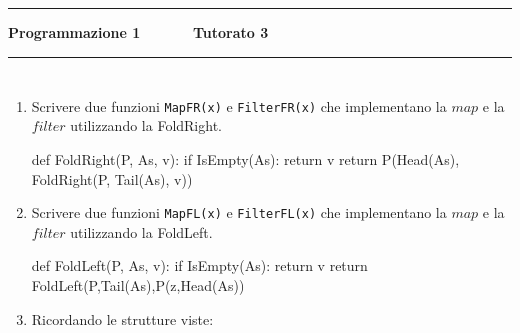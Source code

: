 \documentclass[11pt,a4]{article}
\begin{document}
\thispagestyle{empty}
\hrule
\begin{center}
   {\Large {\bf Programmazione 1 \hspace{3cm} $\quad \quad \quad$ Tutorato 3}}
\end{center}

\hrule

\section*{}

\begin{enumerate}

\item Scrivere due funzioni {\tt MapFR(x)} e {\tt FilterFR(x)} che implementano la $map$ e la $filter$ utilizzando la FoldRight.

\begin{python}
def FoldRight(P, As, v):
    if IsEmpty(As):
        return v
    return P(Head(As), FoldRight(P, Tail(As), v))
\end{python}


\item Scrivere due funzioni {\tt MapFL(x)} e {\tt FilterFL(x)} che implementano la $map$ e la $filter$ utilizzando la FoldLeft.

\begin{python}
def FoldLeft(P, As, v):
    if IsEmpty(As):
        return v
    return FoldLeft(P,Tail(As),P(z,Head(As))
\end{python}

\item Ricordando le strutture viste:

\begin{multicols}{2}
\small
{}
\columnbreak


\end{multicols}
\end{enumerate}
\end{document}

